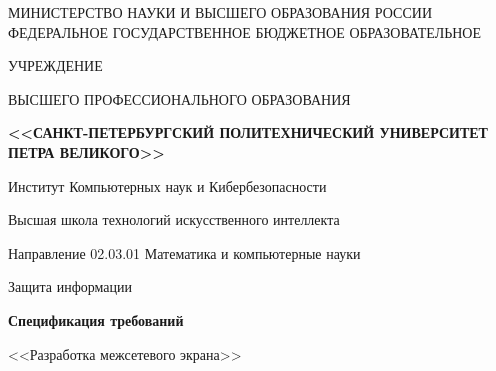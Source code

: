 \documentclass[12pt,a4paper,final]{article}
\begin{document}
	\noindent
	\begin{center}
		\thispagestyle{empty}
		\large{МИНИСТЕРСТВО НАУКИ И ВЫСШЕГО ОБРАЗОВАНИЯ РОССИИ\\
			\vspace{3mm}
			ФЕДЕРАЛЬНОЕ ГОСУДАРСТВЕННОЕ БЮДЖЕТНОЕ ОБРАЗОВАТЕЛЬНОЕ}\end{center}\vspace{-5mm}
	\begin{center}\large{УЧРЕЖДЕНИЕ}\end{center}
	\begin{center}\vspace{-3mm}\large{ВЫСШЕГО ПРОФЕССИОНАЛЬНОГО ОБРАЗОВАНИЯ}\end{center}
	\begin{center}\large\textbf{<<САНКТ-ПЕТЕРБУРГСКИЙ ПОЛИТЕХНИЧЕСКИЙ УНИВЕРСИТЕТ
			ПЕТРА ВЕЛИКОГО>>}\end{center}
	\begin{center}
		\normalsize{Институт Компьютерных наук и Кибербезопасности}
	\end{center}
	\begin{center}
		Высшая школа технологий искусственного интеллекта
	\end{center}
	\begin{center}
		Направление 02.03.01 Математика и компьютерные науки
	\end{center}
	
	\vspace{0.3cm}
	
	\begin{center}
		\large Защита информации
	\end{center}
	\begin{center}
		\Large\textbf{Спецификация требований} 
	\end{center}
	\begin{center}
		\large<<Разработка межсетевого экрана>> 
        \end{center}
\end{document}
